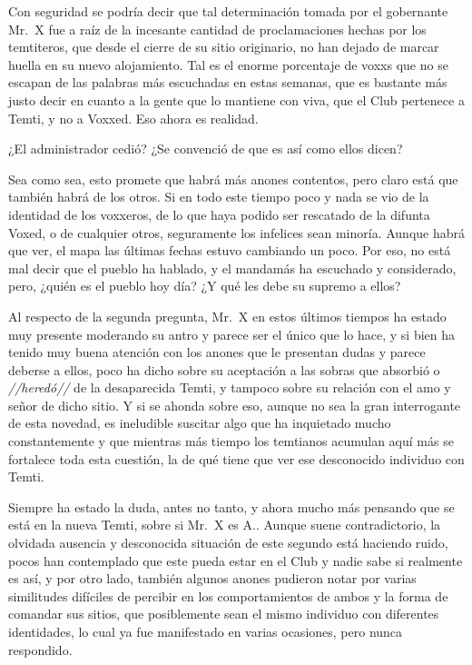\documentclass[
  spanish,
]{book}
\begin{document}
Con seguridad se podría decir que tal determinación tomada por el gobernante Mr.~X fue a raíz de la incesante cantidad de proclamaciones hechas por los temtiteros, que desde el cierre de su sitio originario, no han dejado de marcar huella en su nuevo alojamiento. Tal es el enorme porcentaje de voxxs que no se escapan de las palabras más escuchadas en estas semanas, que es bastante más justo decir en cuanto a la gente que lo mantiene con viva, que el Club pertenece a Temti, y no a Voxxed. Eso ahora es realidad.

¿El administrador cedió? ¿Se convenció de que es así como ellos dicen?

Sea como sea, esto promete que habrá más anones contentos, pero claro está que también habrá de los otros. Si en todo este tiempo poco y nada se vio de la identidad de los voxxeros, de lo que haya podido ser rescatado de la difunta Voxed, o de cualquier otros, seguramente los infelices sean minoría. Aunque habrá que ver, el mapa las últimas fechas estuvo cambiando un poco. Por eso, no está mal decir que el pueblo ha hablado, y el mandamás ha escuchado y considerado, pero, ¿quién es el pueblo hoy día? ¿Y qué les debe su supremo a ellos?

Al respecto de la segunda pregunta, Mr.~X en estos últimos tiempos ha estado muy presente moderando su antro y parece ser el único que lo hace, y si bien ha tenido muy buena atención con los anones que le presentan dudas y parece deberse a ellos, poco ha dicho sobre su aceptación a las sobras que absorbió o \emph{//heredó//} de la desaparecida Temti, y tampoco sobre su relación con el amo y señor de dicho sitio. Y si se ahonda sobre eso, aunque no sea la gran interrogante de esta novedad, es ineludible suscitar algo que ha inquietado mucho constantemente y que mientras más tiempo los temtianos acumulan aquí más se fortalece toda esta cuestión, la de qué tiene que ver ese desconocido individuo con Temti.

Siempre ha estado la duda, antes no tanto, y ahora mucho más pensando que se está en la nueva Temti, sobre si Mr.~X es A.. Aunque suene contradictorio, la olvidada ausencia y desconocida situación de este segundo está haciendo ruido, pocos han contemplado que este pueda estar en el Club y nadie sabe si realmente es así, y por otro lado, también algunos anones pudieron notar por varias similitudes difíciles de percibir en los comportamientos de ambos y la forma de comandar sus sitios, que posiblemente sean el mismo individuo con diferentes identidades, lo cual ya fue manifestado en varias ocasiones, pero nunca respondido.
\end{document}
